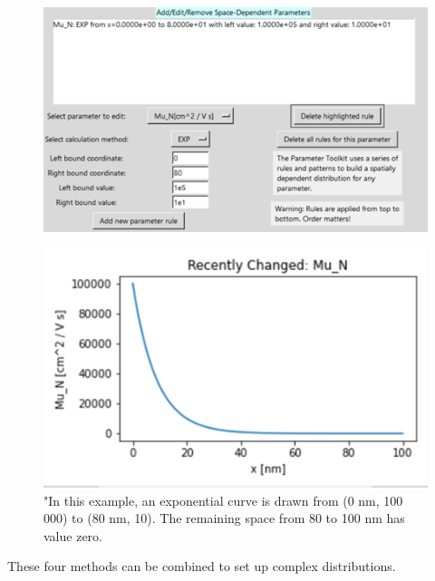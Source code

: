 \documentclass[11pt,letterpaper,titlepage]{article}
\begin{document}
		\begin{figure}[H]
			\label{fig:ptoolkit_exp}
			\centering
			\includegraphics[scale=1]{"ptoolkit_exp"}
		\end{figure}
		\begin{figure}[H]
			\label{fig:ptoolkit_exp_plot}
			\centering
			\includegraphics[scale=1]{"ptoolkit_exp_plot"}
			\caption{"In this example, an exponential curve is drawn from (0 nm, 100 000) to (80 nm, 10). The remaining space from 80 to 100 nm has value zero.}
		\end{figure}
		
		\par These four methods can be combined to set up complex distributions.
		
\end{document}
